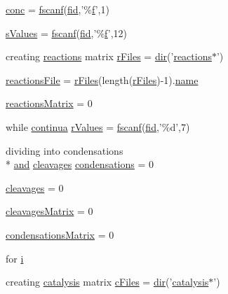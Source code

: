 \begin{DoxyCompactItemize}
\item 
\hyperlink{a00021_a941dee33725f074478fdcbf15e1c35ae}{conc} = \hyperlink{a00019_a028ac102a731e62fb0a7439381f566c1}{fscanf}(\hyperlink{a00025_ae9011d40c6f13e68e6f07156e0da7c5d}{fid},'\%\hyperlink{a00019_a9c5a71c46b1abb8b7df5ebeac6c81535}{f}',1)
\item 
\hyperlink{a00021_a02a2184ac978f50472408ca644862302}{s\-Values} = \hyperlink{a00019_a028ac102a731e62fb0a7439381f566c1}{fscanf}(\hyperlink{a00025_ae9011d40c6f13e68e6f07156e0da7c5d}{fid},'\%\hyperlink{a00019_a9c5a71c46b1abb8b7df5ebeac6c81535}{f}',12)
\item 
creating \hyperlink{a00015}{reactions} matrix \hyperlink{a00021_ad75735665492cabd747370126464fddf}{r\-Files} = \hyperlink{a00065_a4ca269cf93df1b512b52174c1a256fe5}{dir}('\hyperlink{a00015}{reactions}$\ast$')
\item 
\hyperlink{a00021_a4c72dba1fe2ee2fbcc699262a8d0c624}{reactions\-File} = \hyperlink{a00024_ad75735665492cabd747370126464fddf}{r\-Files}(length(\hyperlink{a00024_ad75735665492cabd747370126464fddf}{r\-Files})-\/1).\hyperlink{a00021_abbf559a76fab59203496b0847ab9502a}{name}
\item 
\hyperlink{a00021_ac52097a2745fcef31eb175d2e9485845}{reactions\-Matrix} = 0
\item 
while \hyperlink{a00024_a9c951ebd5bc3f1adce943bee1255f4d6}{continua} \hyperlink{a00021_a436a6968124e560649654a4abbd9dac6}{r\-Values} = \hyperlink{a00019_a028ac102a731e62fb0a7439381f566c1}{fscanf}(\hyperlink{a00025_ae9011d40c6f13e68e6f07156e0da7c5d}{fid},'\%d',7)
\item 
dividing into condensations \\*
\hyperlink{a00022_a170f8acb213f91bf71c77b1d20bceb33}{and} \hyperlink{a00024_a89060c6979e5a4ff7b0985b35f295695}{cleavages} \hyperlink{a00021_ad3aa27d88a7e9d77d8334155860269bb}{condensations} = 0
\item 
\hyperlink{a00021_a89060c6979e5a4ff7b0985b35f295695}{cleavages} = 0
\item 
\hyperlink{a00021_a1a691fb4f955887edfa538e91479fafe}{cleavages\-Matrix} = 0
\item 
\hyperlink{a00021_afaba8eef2f8f4e4dda2e893a19e55a94}{condensations\-Matrix} = 0
\item 
for \hyperlink{a00021_a1de1a45bc56b002aa1ad94bb5f54a1ca}{i}
\item 
creating \hyperlink{a00006}{catalysis} matrix \hyperlink{a00021_a9eab57ccb42a39c704f47dc30e4f4515}{c\-Files} = \hyperlink{a00065_a4ca269cf93df1b512b52174c1a256fe5}{dir}('\hyperlink{a00006}{catalysis}$\ast$')

\end{DoxyCompactItemize}
